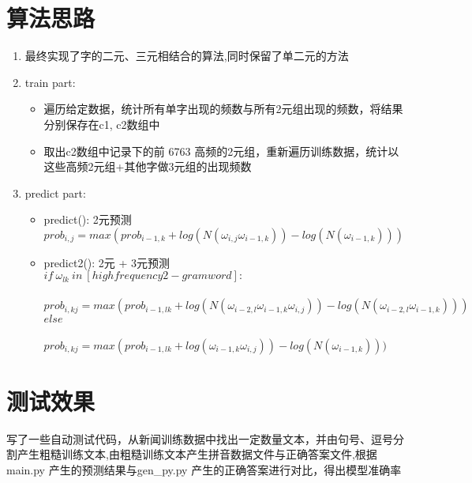 \documentclass[]{article}
\begin{document}
\section{算法思路}
\begin{enumerate}
    \item 最终实现了字的二元、三元相结合的算法,同时保留了单二元的方法
    \item {
        train part:
        \begin{itemize}
            \item 遍历给定数据，统计所有单字出现的频数与所有2元组出现的频数，将结果分别保存在c1, c2数组中
            \item 取出c2数组中记录下的前 6763 高频的2元组，重新遍历训练数据，统计以这些高频2元组+其他字做3元组的出现频数
        \end{itemize}
    }
    \item {
        predict part:
        \begin{itemize}
            \item{
                predict(): 2元预测\\
                $
                    prob_{i,j} = max(prob_{i-1,k} + log(N(\omega_{i,j}\omega_{i-1,k})) - log(N(\omega_{i-1,k})))
                $
            }
            \item{
                predict2(): 2元 + 3元预测\\
                $if\ \omega_{lk}\  in\  [high frequency 2-gram word]:$\\
                \ \ \ \ $prob_{i, kj} = max(prob_{i-1, lk} + log(N(\omega_{i-2,l}\omega_{i-1,k}\omega_{i,j})) - log(N(\omega_{i-2,l}\omega_{i-1,k}))) $\\
                $else$\\
                \ \ \ \ $prob_{i, kj} = max(prob_{i-1, lk} + log(\omega_{i-1,k}\omega_{i,j})) - log(N(\omega_{i-1,k}))) $\\

            }
        \end{itemize}
    }
\end{enumerate}

\section{测试效果}
写了一些自动测试代码，从新闻训练数据中找出一定数量文本，并由句号、逗号分割产生粗糙训练文本,由粗糙训练文本产生拼音数据文件与正确答案文件,根据main.py 产生的预测结果与gen\_py.py 产生的正确答案进行对比，得出模型准确率
\end{document}
